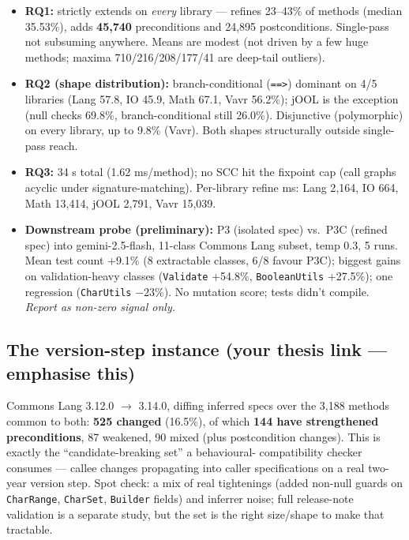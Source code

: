 \documentclass[11pt]{article}
\begin{document}
\begin{itemize}[leftmargin=1.4em,itemsep=0.05em]
  \item \textbf{RQ1:} strictly extends on \emph{every} library --- refines
        23--43\% of methods (median 35.53\%), adds \textbf{45{,}740}
        preconditions and 24{,}895 postconditions. Single-pass not subsuming
        anywhere. Means are modest (not driven by a few huge methods; maxima
        710/216/208/177/41 are deep-tail outliers).
  \item \textbf{RQ2 (shape distribution):} branch-conditional
        (\texttt{==>}) dominant on 4/5 libraries (Lang 57.8, IO 45.9, Math
        67.1, Vavr 56.2\%); jOOL is the exception (null checks 69.8\%,
        branch-conditional still 26.0\%). Disjunctive (polymorphic) on every
        library, up to 9.8\% (Vavr). Both shapes structurally outside
        single-pass reach.
  \item \textbf{RQ3:} 34 s total (1.62 ms/method); no SCC hit the fixpoint cap
        (call graphs acyclic under signature-matching). Per-library refine ms:
        Lang 2{,}164, IO 664, Math 13{,}414, jOOL 2{,}791, Vavr 15{,}039.
  \item \textbf{Downstream probe (preliminary):} P3 (isolated spec) vs.\ P3C
        (refined spec) into gemini-2.5-flash, 11-class Commons Lang subset,
        temp 0.3, 5 runs. Mean test count +9.1\% (8 extractable classes, 6/8
        favour P3C); biggest gains on validation-heavy classes (\texttt{Validate}
        +54.8\%, \texttt{BooleanUtils} +27.5\%); one regression
        (\texttt{CharUtils} $-23\%$). No mutation score; tests didn't compile.
        \emph{Report as non-zero signal only.}
\end{itemize}

\subsection{The version-step instance (your thesis link --- emphasise this)}

Commons Lang 3.12.0 $\to$ 3.14.0, diffing inferred specs over the 3{,}188
methods common to both: \textbf{525 changed} (16.5\%), of which \textbf{144
have strengthened preconditions}, 87 weakened, 90 mixed (plus postcondition
changes). This is exactly the ``candidate-breaking set'' a behavioural-
compatibility checker consumes --- callee changes propagating into caller
specifications on a real two-year version step. Spot check: a mix of real
tightenings (added non-null guards on \texttt{CharRange}, \texttt{CharSet},
\texttt{Builder} fields) and inferrer noise; full release-note validation is a
separate study, but the set is the right size/shape to make that tractable.
\end{document}
